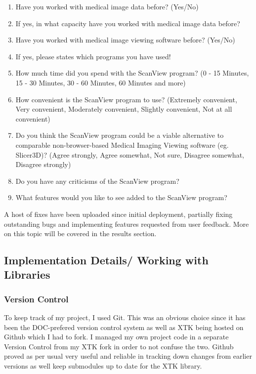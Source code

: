 \documentclass[a4paper,11pt,twoside]{article}
\begin{document}
\begin{enumerate}
\item Have you worked with medical image data before? (Yes/No)
\item If yes, in what capacity have you worked with medical image data before?
\item Have you worked with medical image viewing software before? (Yes/No)
\item If yes, please states which programs you have used!
\item How much time did you spend with the ScanView program? (0 - 15 Minutes, 15 - 30 Minutes, 30 - 60 Minutes, 60 Minutes and more)
\item How convenient is the ScanView program to use? (Extremely convenient, Very convenient, Moderately convenient, Slightly convenient, Not at all convenient)
\item Do you think the ScanView program could be a viable alternative to comparable non-browser-based Medical Imaging Viewing software (eg. Slicer3D)? (Agree strongly, Agree somewhat, Not sure, Disagree somewhat, Disagree strongly)
\item Do you have any criticisms of the ScanView program?
\item What features would you like to see added to the ScanView program?
\end{enumerate}





A host of fixes have been uploaded since initial deployment, partially fixing outstanding bugs and implementing features requested from user feedback. More on this topic will be covered in the results section.





\subsection{Implementation Details/ Working with Libraries}

\subsubsection{Version Control}

To keep track of my project, I used Git. This was an obvious choice since it has been the DOC-prefered version control system as well as XTK being hosted on Github which I had to fork. I managed my own project code in a separate Version Control from my XTK fork in order to not confuse the two. Github proved as per usual very useful and reliable in tracking down changes from earlier versions as well keep submodules up to date for the XTK library. 
\end{document}
